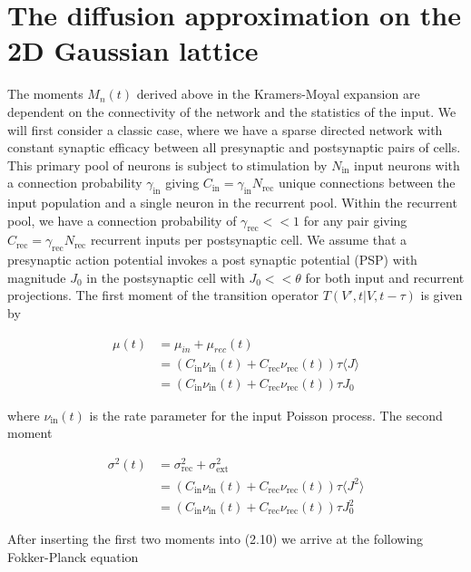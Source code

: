 \documentclass{ucetd}
\begin{document}
\section{The diffusion approximation on the 2D Gaussian lattice}

The moments $M_{n}(t)$ derived above in the Kramers-Moyal expansion are dependent on the connectivity of the network and the statistics of the input. We will first consider a classic case, where we have a sparse directed network with constant synaptic efficacy between all presynaptic and postsynaptic pairs of cells. This primary pool of neurons is subject to stimulation by $N_{\mathrm{in}}$ input neurons with a connection probability $\gamma_{\mathrm{in}}$ giving $C_{\mathrm{in}} = \gamma_{\mathrm{in}}N_{\mathrm{rec}}$ unique connections between the input population and a single neuron in the recurrent pool. Within the recurrent pool, we have a connection probability of $\gamma_{\mathrm{rec}} << 1$ for any pair giving $C_{\mathrm{rec}} = \gamma_{\mathrm{rec}} N_{\mathrm{rec}}$ recurrent inputs per postsynaptic cell. We assume that a presynaptic action potential invokes a post synaptic potential (PSP) with magnitude $J_{0}$ in the postsynaptic cell with $J_{0} << \theta$ for both input and recurrent projections. The first moment of the transition operator $T(V',t| V,t-\tau)$ is given by

\begin{align*}
\mu(t) &= \mu_{in} + \mu_{rec}(t)\\
&= \left(C_{\mathrm{in}}\nu_{\mathrm{in}}(t) + C_{\mathrm{rec}}\nu_{\mathrm{rec}}(t)\right)\tau\langle J\rangle\\
&= \left(C_{\mathrm{in}}\nu_{\mathrm{in}}(t) + C_{\mathrm{rec}}\nu_{\mathrm{rec}}(t)\right)\tau J_{0}
\end{align*}

where $\nu_{\mathrm{in}}(t)$ is the rate parameter for the input Poisson process. The second moment

\begin{align*}
\sigma^{2}(t) &= \sigma_{\mathrm{rec}}^{2} + \sigma_{\mathrm{ext}}^{2}\\
&= \left(C_{\mathrm{in}}\nu_{\mathrm{in}}(t) + C_{\mathrm{rec}}\nu_{\mathrm{rec}}(t)\right)\tau\langle J^{2}\rangle\\
&= \left(C_{\mathrm{in}}\nu_{\mathrm{in}}(t) + C_{\mathrm{rec}}\nu_{\mathrm{rec}}(t)\right)\tau J_{0}^{2}
\end{align*}

After inserting the first two moments into (2.10) we arrive at the following Fokker-Planck equation
\end{document}
